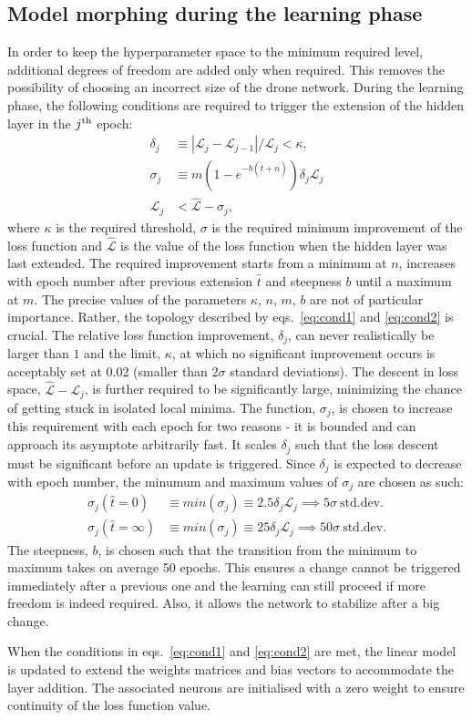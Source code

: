 \subsection{Model morphing during the learning phase}

In order to keep the hyperparameter space to the minimum required level,
additional degrees of freedom are added only when required.
This removes the possibility of choosing an incorrect size of the
drone network. During the learning phase, the following conditions are required
to trigger the extension of the hidden layer in the $j^{\rm th}$ epoch:
\begin{align}
\delta_{j} &\equiv |\mathcal{L}_j-\mathcal{L}_{j-1}|/\mathcal{L}_j < \kappa,\label{eq:cond1}\\
\sigma_{j} &\equiv m (1 - e^{-b(\hat{t} + n)})\delta_{j}\mathcal{L}_j \nonumber\\
\mathcal{L}_j &< \hat{\mathcal{L}} - \sigma_{j} \label{eq:cond2},
\end{align}
where $\kappa$ is the required threshold, $\sigma$ is the required minimum improvement
of the loss function and $\hat{\mathcal{L}}$ is the value of the loss function when
the hidden layer was last extended. The required improvement starts from a minimum at $n$,
increases with epoch number after previous extension $\hat{t}$ and steepness $b$
until a maximum at $m$. The precise values of the parameters
$\kappa$, $n$, $m$, $b$ are not of particular importance. Rather, the topology described by
eqs.~\ref{eq:cond1} and \ref{eq:cond2} is crucial. The relative loss function improvement,
$\delta_{j}$, can never realistically be larger than $1$ and the limit, $\kappa$, at which
no significant improvement occurs is acceptably set at 0.02 (smaller than $2\sigma$
standard deviations). The descent in loss space, $\hat{\mathcal{L}} - \mathcal{L}_j$,
is further required to be significantly large, minimizing the chance of getting stuck in
isolated local minima. The function, $\sigma_{j}$, is chosen to increase this requirement
with each epoch for two reasons - it is bounded and can approach its asymptote arbitrarily fast.
It scales $\delta_{j}$ such that the loss descent must be significant
before an update is triggered. Since $\delta_{j}$ is expected to decrease with epoch number,
the minumum and maximum values of $\sigma_{j}$ are chosen as such:
\begin{align}
\sigma_{j}(\hat{t} = 0) &\equiv min(\sigma_{j}) \equiv 2.5\delta_{j}\mathcal{L}_j \implies 5\sigma ~\text{std.dev.} \\
\sigma_{j}(\hat{t} = \infty) &\equiv min(\sigma_{j}) \equiv 25\delta_{j}\mathcal{L}_j \implies 50\sigma ~\text{std.dev.}
\end{align}
The steepness, $b$, is chosen such that the transition from the minimum to maximum takes
on average 50 epochs. This ensures a change cannot be triggered immediately
after a previous one and the learning can still proceed if more freedom is indeed required.
Also, it allows the network to stabilize after a big change.

When the conditions in eqs.~\ref{eq:cond1} and \ref{eq:cond2} are met, the linear model
is updated to extend the weights matrices and bias vectors
to accommodate the layer addition.
The associated neurons are initialised with a zero weight
to ensure continuity of the loss function value.
